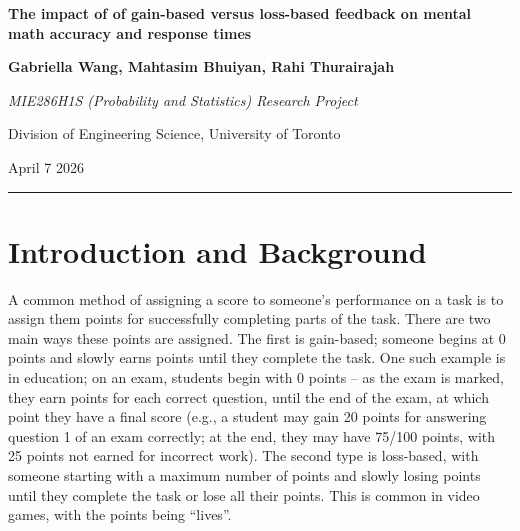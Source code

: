 \documentclass[12pt]{exam}
\begin{document}
\setlength{\parindent}{0pt}

\begin{titlepage}
    \begin{center}
        \vspace*{1cm}

        {\huge \textbf{The impact of of gain-based versus loss-based feedback on mental math accuracy and response times}}

        \vspace*{1.5cm}

        \textbf{Gabriella Wang, Mahtasim Bhuiyan, Rahi Thurairajah}
        
        \textit{MIE286H1S (Probability and Statistics) Research Project}
        \vspace*{0.5cm}

        Division of Engineering Science, University of Toronto
        \vspace*{0.5cm}
        
        April 7 2026
        \vspace*{0.5cm}
\hrule
\end{center}
\end{titlepage}
\newpage
\tableofcontents
\newpage
\setcounter{page}{1}  %

\section{Introduction and Background}
A common method of assigning a score to someone’s performance on a task is to assign them points for successfully completing parts of the task. There are two main ways these points are assigned. The first is gain-based; someone begins at 0 points and slowly earns points until they complete the task. One such example is in education; on an exam, students begin with 0 points – as the exam is marked, they earn points for each correct question, until the end of the exam, at which point they have a final score (e.g., a student may gain 20 points for answering question 1 of an exam correctly; at the end, they may have 75/100 points, with 25 points not earned for incorrect work). The second type is loss-based, with someone starting with a maximum number of points and slowly losing points until they complete the task or lose all their points. This is common in video games, with the points being “lives”.\newline
\end{document}
